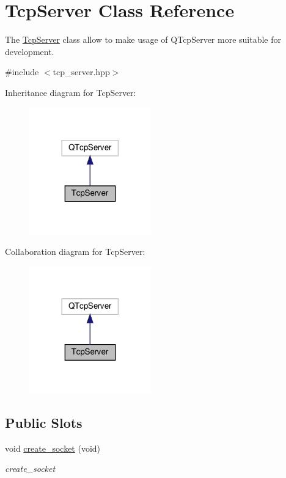 \hypertarget{class_tcp_server}{}\section{Tcp\+Server Class Reference}
\label{class_tcp_server}


The \mbox{\hyperlink{class_tcp_server}{Tcp\+Server}} class allow to make usage of Q\+Tcp\+Server more suitable for development.  




{\ttfamily \#include $<$tcp\+\_\+server.\+hpp$>$}



Inheritance diagram for Tcp\+Server\+:\nopagebreak
\begin{figure}[H]
\begin{center}
\leavevmode
\includegraphics[width=149pt]{class_tcp_server__inherit__graph}
\end{center}
\end{figure}


Collaboration diagram for Tcp\+Server\+:\nopagebreak
\begin{figure}[H]
\begin{center}
\leavevmode
\includegraphics[width=149pt]{class_tcp_server__coll__graph}
\end{center}
\end{figure}
\subsection*{Public Slots}
\begin{DoxyCompactItemize}
\item 
void \mbox{\hyperlink{class_tcp_server_a90ee8945eb2ceec552f5f7a850fd9dce}{create\+\_\+socket}} (void)
\begin{DoxyCompactList}\small\item\em create\+\_\+socket \end{DoxyCompactList}\end{DoxyCompactItemize}
